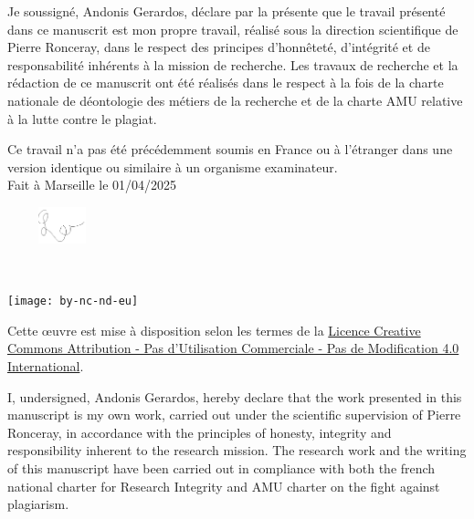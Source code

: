 \newpage
{}
\label{chap:affidavit}
\thispagestyle{empty}

\iftrue %
    Je soussigné, Andonis Gerardos, %
    déclare par la présente que le travail présenté dans ce manuscrit est mon propre travail, réalisé sous la direction scientifique de Pierre Ronceray, %
    dans le respect des principes d’honnêteté, d'intégrité et de responsabilité inhérents à la mission de recherche. Les travaux de recherche et la rédaction de ce manuscrit ont été réalisés dans le respect à la fois de la charte nationale de déontologie des métiers de la recherche et de la charte AMU relative à la lutte contre le plagiat.
    
    Ce travail n'a pas été précédemment soumis en France ou à l'étranger dans une version identique ou similaire à un organisme examinateur.\\
    
    Fait à Marseille le 01/04/2025
    
    \begin{flushright}\includegraphics[width=120px,height=40px]{logo/signature.png}\end{flushright}%

    ~\vfill
    \begin{center}
        \begin{minipage}[c]{0.25\linewidth}
            \texttt{[image: by-nc-nd-eu]}
        \end{minipage}\hfill
    \end{center}

    Cette \oe{}uvre est mise à disposition selon les termes de la \href{https://creativecommons.org/licenses/by-nc-nd/4.0/deed.fr}{Licence Creative Commons Attribution - Pas d’Utilisation Commerciale - Pas de Modification 4.0 International}. %
\fi

\iffalse %
    I, undersigned, Andonis Gerardos, %
    hereby declare that the work presented in this manuscript is my own work, carried out under the scientific supervision of Pierre Ronceray, %
    in accordance with the principles of honesty, integrity and responsibility inherent to the research mission. The research work and the writing of this manuscript have been carried out in compliance with both the french national charter for Research Integrity and AMU charter on the fight against plagiarism.
    
